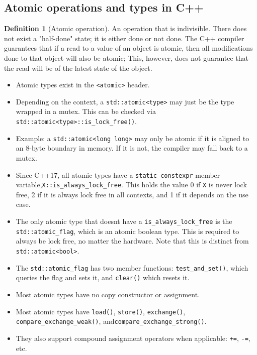 \documentclass[11pt, a4paper]{article}
\theoremstyle{definition}
\newtheorem{definition}[theorem]{Definition}
\theoremstyle{remark}
\newcommand{\code}[1]{\lstinline|#1|}
\begin{document}
\subsection{Atomic operations and types in C++}
\begin{definition}[Atomic operation]
   An operation that is indivisible. There does not exist a "half-done" state; it is either done or not done. The C++ compiler guarantees that if a read to a value of an object is atomic, then all modifications done to that object will also be atomic; This, however, does not guarantee that the read will be of the latest state of the object. 
\end{definition}
\begin{itemize}
    \item Atomic types exist in the \code{<atomic>} header. 
    \item Depending on the context, a \code{std::atomic<type>} may just be the type wrapped in a mutex. This can be checked via \code{std::atomic<type>::is_lock_free()}. 
    \item Example: a \code{std::atomic<long long>} may only be atomic if it is aligned to an 8-byte boundary in memory. If it is not, the compiler may fall back to a mutex.
    \item Since C++17, all atomic types have a \code{static constexpr} member variable,\newline \code{X::is_always_lock_free}. This holds the value 0 if \code{X} is never lock free, 2 if it is always lock free in all contexts, and 1 if it depends on the use case. 
    \item The only atomic type that doesnt have a \code{is_always_lock_free} is the \code{std::atomic_flag}, which is an atomic boolean type. This is required to always be lock free, no matter the hardware. Note that this is distinct from \code{std::atomic<bool>}. 
    \item The \code{std::atomic_flag} has two member functions: \code{test_and_set()}, which queries the flag and sets it, and \code{clear()} which resets it. 
    \item Most atomic types have no copy constructor or assignment. 
    \item Most atomic types have \code{load()}, \code{store()}, \code{exchange()}, \code{compare_exchange_weak()}, and\newline \code{compare_exchange_strong()}. 
    \item They also support compound assignment operators when applicable: \code{+=}, \code{-=}, etc. 

\end{itemize}
\end{document}
